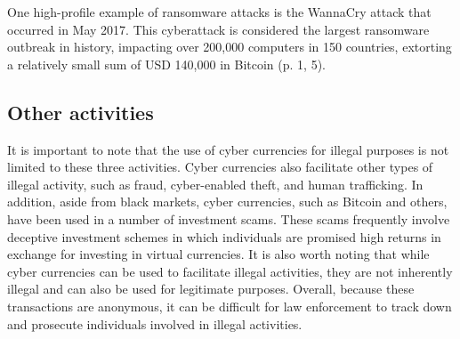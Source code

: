 One high-profile example of ransomware attacks is the WannaCry attack that occurred in May 2017. This cyberattack is considered the largest ransomware outbreak in history, impacting over 200,000 computers in 150 countries, extorting a relatively small sum of USD 140,000 in Bitcoin \cite{alraddadi_comprehensive_nodate} (p. 1, 5).

\subsection*{Other activities}
It is important to note that the use of cyber currencies for illegal purposes is not limited to these three activities. Cyber currencies also facilitate other types of illegal activity, such as fraud, cyber-enabled theft, and human trafficking. In addition, aside from black markets, cyber currencies, such as Bitcoin and others, have been used in a number of investment scams. These scams frequently involve deceptive investment schemes in which individuals are promised high returns in exchange for investing in virtual currencies. It is also worth noting  that while cyber currencies can be used to facilitate illegal activities, they are not inherently illegal and can also be used for legitimate purposes. Overall, because these transactions are anonymous, it can be difficult for law enforcement to track down and prosecute individuals involved in illegal activities. 